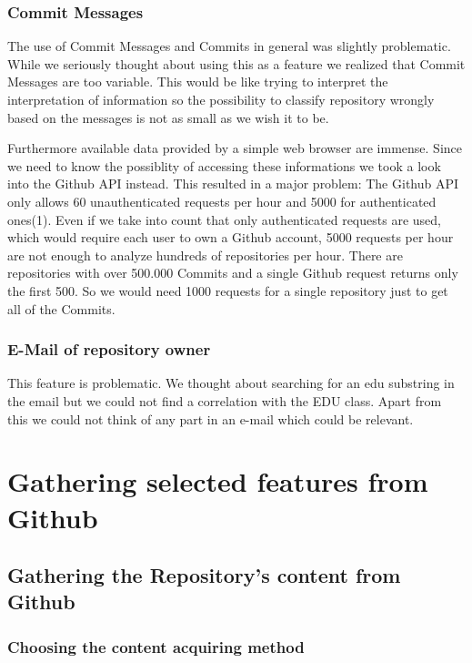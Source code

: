 \documentclass[paper=A4,pagesize=auto,12pt,headinclude=true,footinclude=true,BCOR=0mm,DIV=calc]{scrartcl}
\begin{document}
	\subsubsection{Commit Messages}
	The use of Commit Messages and Commits in general was slightly problematic. While we seriously thought about using this as a feature we realized that Commit Messages are too variable. This would be like trying to interpret the interpretation of information so the possibility to classify repository wrongly based on the messages is not as small as we wish it to be.
	
	
	Furthermore available data provided by a simple web browser are immense. Since we need to know the possiblity of accessing these informations we took a look into the Github API instead. This resulted in a major problem: The Github API only allows 60 unauthenticated requests per hour and 5000 for authenticated ones(1). Even if we take into count that only authenticated requests are used, which would require each user to own a Github account, 5000 requests per hour are not enough to analyze hundreds of repositories per hour. There are repositories with over 500.000 Commits and a single Github request returns only the first 500. So we would need 1000 requests for a single repository just to get all of the Commits.
	
	\subsubsection{E-Mail of repository owner}
	This feature is problematic. We thought about searching for an edu substring in the email but we could not find a correlation with the EDU class. Apart from this we could not think of any part in an e-mail which could be relevant.
	
	
	
	
	
	\section{Gathering selected features from Github}
	
	\subsection{Gathering the Repository’s content from Github}
	
	\subsubsection{Choosing the content acquiring method}
	
\end{document}
